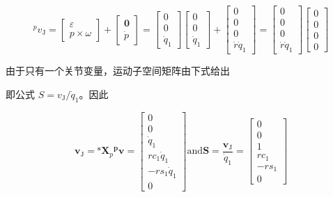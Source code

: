 \documentclass[10pt,a4paper]{book}
\theoremstyle{thmstyle} %
\theoremstyle{defstyle} %
\theoremstyle{prostyle} %
\begin{document}
$$
{ } ^{p} v _ { \mathrm { J } } = { \left[ \begin{array}{l} { \varepsilon } \\{ p \times \omega } \end{array} \right] } + { \left[ \begin{array}{l} { \mathbf { 0 } } \\{ { \dot { p } } } \end{array} \right] } = { \left[ \begin{array}{l} { 0 } \\{ 0 } \\{ { \dot { q } } _ { 1 } } \end{array} \right] } { \left[ \begin{array}{l} { 0 } \\{ 0 } \\{ { \dot { q } } _ { 1 } } \end{array} \right] } + { \left[ \begin{array}{l} { 0 } \\{ 0 } \\{ 0 } \\{ { \dot { r } } { \dot { q } } _ { 1 } } \end{array} \right] } = { \left[ \begin{array}{l} { 0 } \\{ 0 } \\{ 0 } \\{ { \dot { r } } { \dot { q } } _ { 1 } } \end{array} \right] } { \left[ \begin{array}{l} { 0 } \\{ 0 } \\{ 0 } \\{ 0 } \end{array} \right] }
$$



由于只有一个关节变量，运动子空间矩阵由下式给出



即公式 $S = v_{\mathrm{J}}/\dot{q}_{1}$。因此



$$
\boldsymbol { v } _ { \mathrm { J } } = \boldsymbol { { } ^{s} } \boldsymbol { X } _ { p } \boldsymbol { { } ^{p} } \boldsymbol { v } = \left[ \begin{array}{l} { 0 } \\{ 0 } \\{ \dot { q } _ { 1 } } \\{ r c _ { 1 } \dot { q } _ { 1 } } \\{ - r s _ { 1 } \dot { q } _ { 1 } } \\{ 0 } \end{array} \right]  \mathrm { a n d }  \boldsymbol { S } = \frac { \boldsymbol { v } _ { \mathrm { J } } } { \dot { q } _ { 1 } } = \left[ \begin{array}{l} { 0 } \\{ 0 } \\{ 1 } \\{ r c _ { 1 } } \\{ - r s _ { 1 } } \\{ 0 } \end{array} \right]
$$
\end{document}
